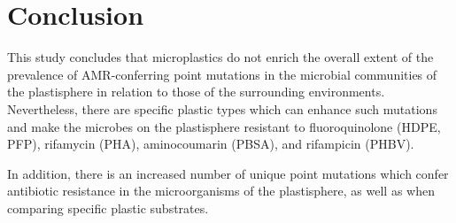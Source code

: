 \chapter{Conclusion}


This study concludes that microplastics do not enrich the overall extent of the prevalence of AMR-conferring point mutations in the microbial communities of the plastisphere in relation to those of the surrounding environments. 
Nevertheless, there are specific plastic types which can enhance such mutations and make the microbes on the plastisphere resistant to fluoroquinolone (HDPE, PFP), rifamycin (PHA), aminocoumarin (PBSA), and rifampicin (PHBV).

In addition, there is an increased number of unique point mutations which confer antibiotic resistance in the microorganisms of the plastisphere, as well as when comparing specific plastic substrates.

